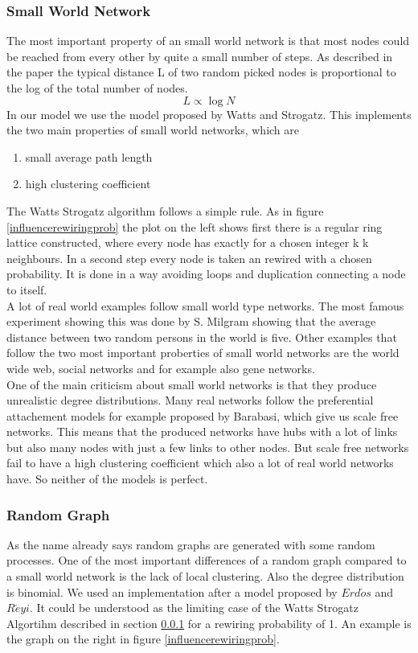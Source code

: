 \subsubsection{Small World Network}
\label{sec:smallworld}
The most important property of an small world network is that most nodes could be reached from every other by quite a small number of steps. As described in the paper \cite{watts98} the typical distance L of two random picked nodes is proportional to the log of the total number of nodes.
\begin{equation}
L \propto \log N
\end{equation}
In our model we use the model proposed by Watts and Strogatz. This implements the two main properties of small world networks, which are
\begin{enumerate}
\item small average path length
\item high clustering coefficient
\end{enumerate}
The Watts Strogatz algorithm follows a simple rule. As in figure \ref{influencerewiringprob} the plot on the left shows first there is a regular ring lattice constructed, where every node has exactly for a chosen integer k k neighbours. In a second step every node is taken an rewired with a chosen probability. It is done in a way avoiding loops and duplication \ie connecting a node to itself.\\
A lot of real world examples follow small world type networks. The most famous experiment showing this was done by S. Milgram showing that the average distance between two random persons in the world is five. Other examples that follow the two most important proberties of small world networks are the world wide web, social networks and for example also gene networks. \\
One of the main criticism about small world networks is that they produce unrealistic degree distributions. Many real networks follow the preferential attachement models for example proposed by Barabasi, which give us scale free networks. This means that the produced networks have hubs with a lot of links but also many nodes with just a few links to other nodes. But scale free networks fail to have a high clustering coefficient which also a lot of real world networks have. So neither of the models is perfect.

\subsubsection{Random Graph}
\label{sec:randomgraph}
As the name already says random graphs are generated with some random processes. One of the most important differences of a random graph compared to a small world network is the lack of local clustering. Also the degree distribution is binomial. We used an implementation after a model proposed by $Erd\acute{o}s$ and $R\acute{e}yi$. It could be understood as the limiting case of the Watts Strogatz Algortihm described in section \ref{sec:smallworld} for a rewiring probability of 1. An example is the graph on the right in figure \ref{influencerewiringprob}.